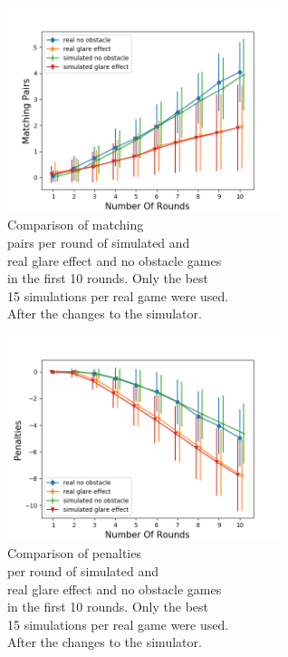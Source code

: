 \begin{minipage}{0.5\textwidth}
	\begin{figure}[H]
		\centering
		\includegraphics[width=8cm]{images/sd15x_10rounds/Figure_3.png}
		\caption[Bild kurz]{Comparison of matching \\\hspace{0\textwidth}pairs per round of simulated and\\\hspace{0\textwidth} real glare effect and no obstacle games\\\hspace{0\textwidth} in the first 10 rounds. Only the best \\\hspace{0\textwidth} 15 simulations per real game were used.\\\hspace{0\textwidth} After the changes to the simulator.}
		\label{fig:simOp151}
	\end{figure}
\end{minipage}
\begin{minipage}{0.5\textwidth}
	\begin{figure}[H]
		\centering
		\includegraphics[width=8cm]{images/sd15x_10rounds/Figure_4.png}
		\caption[Bild kurz]{Comparison of penalties\\\hspace{0\textwidth} per round of simulated and\\\hspace{0\textwidth} real glare effect and no obstacle games\\\hspace{0\textwidth} in the first 10 rounds. Only the best \\\hspace{0\textwidth} 15 simulations per real game were used. \\\hspace{0\textwidth} After the changes to the simulator.}
		\label{fig:simOp152}
	\end{figure}
\end{minipage} 

